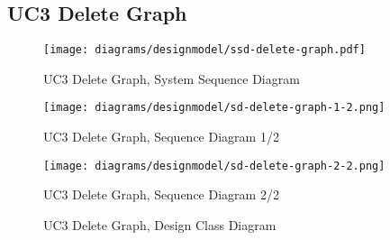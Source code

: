 \subsection{UC3 Delete Graph}
\begin{figure}[H]
    \centering
    \texttt{[image: diagrams/designmodel/ssd-delete-graph.pdf]}
    \caption{UC3 Delete Graph, System Sequence Diagram}
    \label{fig:delete-graph-ssd}
\end{figure}
\begin{figure}[p]%
  \begin{leftfullpage}
    \texttt{[image: diagrams/designmodel/sd-delete-graph-1-2.png]}
    \caption{UC3 Delete Graph, Sequence Diagram 1/2}
    \label{fig:delete-graph-sd-1}
  \end{leftfullpage}
\end{figure}
\begin{figure}[p]%
  \begin{fullpage}
    \texttt{[image: diagrams/designmodel/sd-delete-graph-2-2.png]}
    \caption{UC3 Delete Graph, Sequence Diagram 2/2}
    \label{fig:delete-graph-sd-2}
  \end{fullpage}
\end{figure}
\begin{figure}[H]
    \centering
    \caption{UC3 Delete Graph, Design Class Diagram}
    \label{fig:delete-graph-dcd}
\end{figure}
\newpage
% 
